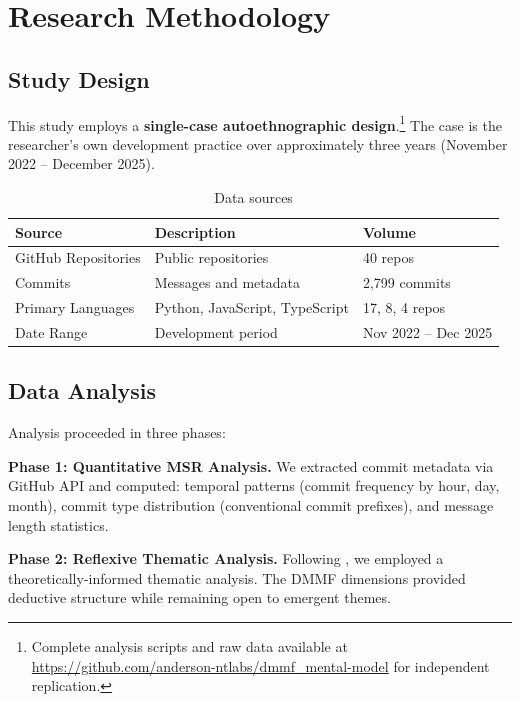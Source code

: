 \documentclass{ntlabs-preprint}
\begin{document}
\section{Research Methodology}

\subsection{Study Design}

This study employs a \textbf{single-case autoethnographic design}.\footnote{Complete analysis scripts and raw data available at \url{https://github.com/anderson-ntlabs/dmmf_mental-model} for independent replication.} The case is the researcher's own development practice over approximately three years (November 2022 -- December 2025).

\begin{table}[h]
\centering
\caption{Data sources}
\label{tab:data-sources}
\begin{tabular}{lll}
\toprule
\textbf{Source} & \textbf{Description} & \textbf{Volume} \\
\midrule
GitHub Repositories & Public repositories                 & 40 repos \\
Commits             & Messages and metadata               & 2,799 commits \\
Primary Languages   & Python, JavaScript, TypeScript      & 17, 8, 4 repos \\
Date Range          & Development period                  & Nov 2022 -- Dec 2025 \\
\bottomrule
\end{tabular}
\end{table}

\subsection{Data Analysis}

Analysis proceeded in three phases:

\textbf{Phase 1: Quantitative MSR Analysis.} We extracted commit metadata via GitHub API and computed: temporal patterns (commit frequency by hour, day, month), commit type distribution (conventional commit prefixes), and message length statistics.

\textbf{Phase 2: Reflexive Thematic Analysis.} Following \citet{braun2006thematic}, we employed a theoretically-informed thematic analysis. The DMMF dimensions provided deductive structure while remaining open to emergent themes.
\end{document}
